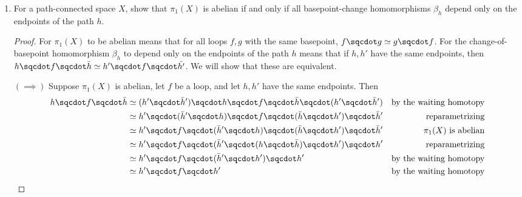 \documentclass[12pt,letterpaper]{article}
\begin{document}
\begin{enumerate}
\vfill
\pagebreak
\item For a path-connected space $X$, show that $\pi_1(X)$ is abelian if and only if all basepoint-change homomorphisms $\beta_h$ depend only on the endpoints of the path $h$. 
\begin{proof}
For $\pi_1(X)$ to be abelian means that for all loops $f,g$ with the same basepoint, $f\sqcdot g\simeq g\sqcdot f$. For the change-of-basepoint homomorphism $\beta_h$ to depend only on the endpoints of the path $h$ means that if $h, h'$ have the same endpoints, then $h \sqcdot f \sqcdot \bar{h} \simeq h' \sqcdot f \sqcdot \bar{h'}$. We will show that these are equivalent. 

$(\implies)$ Suppose $\pi_1(X)$ is abelian, let $f$ be a loop, and let $h, h'$ have the same endpoints. Then 
\begin{align*}
h\sqcdot f \sqcdot \bar{h} & \simeq (h'\sqcdot\bar{h}') \sqcdot h\sqcdot f \sqcdot \bar{h} \sqcdot (h'\sqcdot\bar{h}') & \text{by the waiting homotopy}\\
& \simeq h'\sqcdot (\bar{h}' \sqcdot h)\sqcdot f \sqcdot (\bar{h} \sqcdot h')\sqcdot\bar{h}' & \text{reparametrizing}\\
& \simeq h'\sqcdot f \sqcdot (\bar{h}' \sqcdot h)\sqcdot (\bar{h} \sqcdot h')\sqcdot\bar{h}' & \pi_1(X) \text{ is abelian}\\
&\simeq h'\sqcdot f \sqcdot (\bar{h}'\sqcdot (h\sqcdot\bar{h}) \sqcdot h') \sqcdot h' & \text{reparametrizing}\\
&\simeq h'\sqcdot f \sqcdot (\bar{h}'\sqcdot h') \sqcdot h' & \text{by the waiting homotopy}\\
&\simeq h'\sqcdot f \sqcdot h' & \text{by the waiting homotopy}
\end{align*}


\end{proof}
\end{enumerate}
\end{document}
